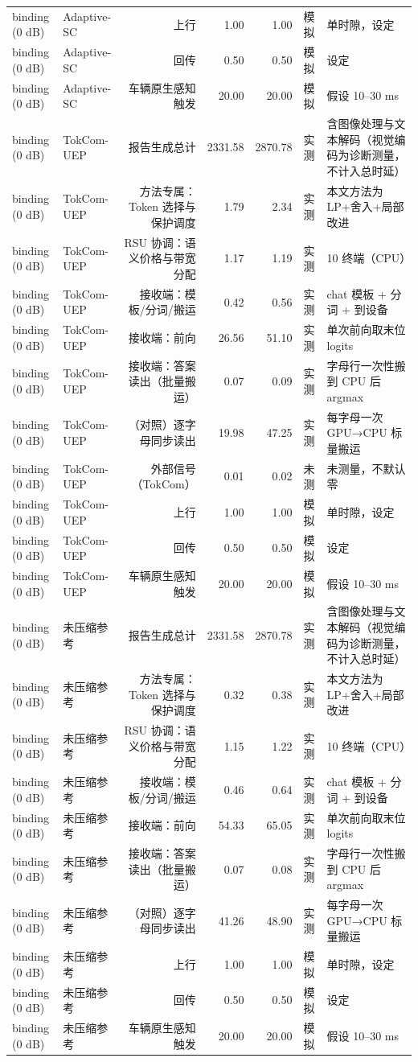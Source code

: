 \begin{tabular}{llrrrl}
binding (0 dB) & Adaptive-SC & 上行 & 1.00 & 1.00 & 模拟 & 单时隙，设定\\
binding (0 dB) & Adaptive-SC & 回传 & 0.50 & 0.50 & 模拟 & 设定\\
binding (0 dB) & Adaptive-SC & 车辆原生感知触发 & 20.00 & 20.00 & 模拟 & 假设 10–30 ms\\
binding (0 dB) & TokCom-UEP & 报告生成总计 & 2331.58 & 2870.78 & 实测 & 含图像处理与文本解码（视觉编码为诊断测量，不计入总时延）\\
binding (0 dB) & TokCom-UEP & 方法专属：Token 选择与保护调度 & 1.79 & 2.34 & 实测 & 本文方法为 LP+舍入+局部改进\\
binding (0 dB) & TokCom-UEP & RSU 协调：语义价格与带宽分配 & 1.17 & 1.19 & 实测 & 10 终端（CPU）\\
binding (0 dB) & TokCom-UEP & 接收端：模板/分词/搬运 & 0.42 & 0.56 & 实测 & chat 模板 + 分词 + 到设备\\
binding (0 dB) & TokCom-UEP & 接收端：前向 & 26.56 & 51.10 & 实测 & 单次前向取末位 logits\\
binding (0 dB) & TokCom-UEP & 接收端：答案读出（批量搬运） & 0.07 & 0.09 & 实测 & 字母行一次性搬到 CPU 后 argmax\\
binding (0 dB) & TokCom-UEP & （对照）逐字母同步读出 & 19.98 & 47.25 & 实测 & 每字母一次 GPU→CPU 标量搬运\\
binding (0 dB) & TokCom-UEP & 外部信号（TokCom） & 0.01 & 0.02 & 未测 & 未测量，不默认零\\
binding (0 dB) & TokCom-UEP & 上行 & 1.00 & 1.00 & 模拟 & 单时隙，设定\\
binding (0 dB) & TokCom-UEP & 回传 & 0.50 & 0.50 & 模拟 & 设定\\
binding (0 dB) & TokCom-UEP & 车辆原生感知触发 & 20.00 & 20.00 & 模拟 & 假设 10–30 ms\\
binding (0 dB) & 未压缩参考 & 报告生成总计 & 2331.58 & 2870.78 & 实测 & 含图像处理与文本解码（视觉编码为诊断测量，不计入总时延）\\
binding (0 dB) & 未压缩参考 & 方法专属：Token 选择与保护调度 & 0.32 & 0.38 & 实测 & 本文方法为 LP+舍入+局部改进\\
binding (0 dB) & 未压缩参考 & RSU 协调：语义价格与带宽分配 & 1.15 & 1.22 & 实测 & 10 终端（CPU）\\
binding (0 dB) & 未压缩参考 & 接收端：模板/分词/搬运 & 0.46 & 0.64 & 实测 & chat 模板 + 分词 + 到设备\\
binding (0 dB) & 未压缩参考 & 接收端：前向 & 54.33 & 65.05 & 实测 & 单次前向取末位 logits\\
binding (0 dB) & 未压缩参考 & 接收端：答案读出（批量搬运） & 0.07 & 0.08 & 实测 & 字母行一次性搬到 CPU 后 argmax\\
binding (0 dB) & 未压缩参考 & （对照）逐字母同步读出 & 41.26 & 48.90 & 实测 & 每字母一次 GPU→CPU 标量搬运\\
binding (0 dB) & 未压缩参考 & 上行 & 1.00 & 1.00 & 模拟 & 单时隙，设定\\
binding (0 dB) & 未压缩参考 & 回传 & 0.50 & 0.50 & 模拟 & 设定\\
binding (0 dB) & 未压缩参考 & 车辆原生感知触发 & 20.00 & 20.00 & 模拟 & 假设 10–30 ms\\
\hline
\end{tabular}
